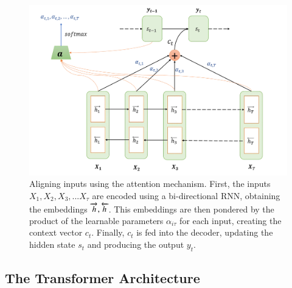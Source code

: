 \begin{figure}[!h]
	\centering
	\includegraphics[width=0.7\linewidth]{figures/alignment_attention}
	\caption{Aligning inputs using the attention mechanism. First, the inputs $X_1, X_2, X_3, ... X_{\tau}$ are encoded using a bi-directional RNN, obtaining the embeddings $\protect\overrightarrow{h} , \protect\overleftarrow{h}$. This embeddings are then pondered by the product of the learnable parameters $\alpha_{i \tau}$ for each input, creating the context vector $c_t$. Finally, $c_t$ is fed into the decoder, updating the hidden state $s_t$ and producing the output $y_t$.}
	\label{fig:alignmentattention}
\end{figure}


\subsection{The Transformer Architecture}
\label{sec:transformer}

